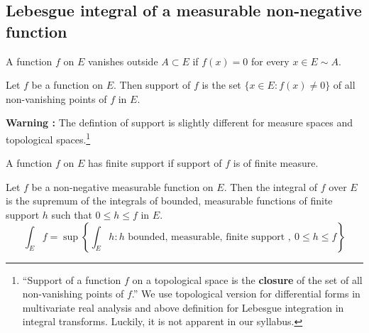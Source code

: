 \subsection{Lebesgue integral of a measurable non-negative function}
\begin{definition}[vanishing]
	A function $f$ on $E$ vanishes outside $A \subset E$ if $f(x) = 0$ for every $x \in E \sim A$.
\end{definition}
\begin{definition}[support]
	Let $f$ be a function on $E$.
	Then support of $f$ is the set $\{ x \in E : f(x) \ne 0 \}$ of all non-vanishing points of $f$ in $E$.
\end{definition}
\textbf{Warning : }The defintion of support is slightly different for measure spaces and topological spaces.\dag\footnote{
	``Support of a function $f$ on a topological space is the \textbf{closure} of the set of all non-vanishing points of $f$.''
	We use topological version for differential forms in multivariate real analysis and above definition for Lebesgue integration in integral transforms.
	Luckily, it is not apparent in our syllabus.
	}
\begin{definition}
	A function $f$ on $E$ has finite support if support of $f$ is of finite measure.
\end{definition}
\begin{definition}
	Let $f$ be a non-negative measurable function on $E$.
	Then the integral of $f$ over $E$ is the supremum of the integrals of bounded, measurable functions of finite support $h$ such that  $0 \le h \le f$ in $E$.
	\begin{equation}
		\int_E f = \sup \left\{ \int_E h : h \text{ bounded, measurable, finite support },\ 0 \le h \le f \right\}
	\end{equation}
\end{definition}

